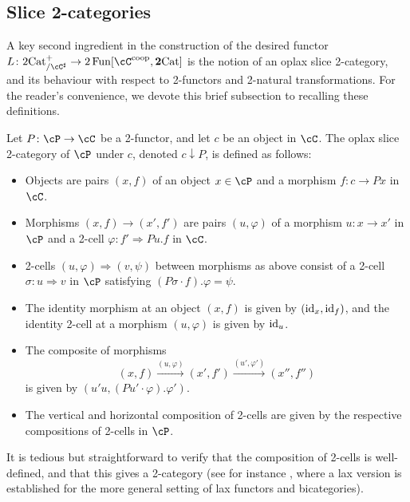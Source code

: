 \documentclass[11pt, dvipsnames]{amsart}
\begin{document}
\subsection{Slice 2-categories}

A key second ingredient in the construction of the desired functor $L\colon\mslicetwocat\to 2\Fun[\cC^\coop,\ttwocat]$ is the notion of an oplax slice 2-category, and its behaviour with respect to 2-functors and 2-natural transformations. For the reader's convenience, we devote this brief subsection to recalling these definitions.

\begin{defn}\label{defn:marked-slices}
    Let $P\colon\cP\to\cC$ be a 2-functor, and let $c$ be an object in $\cC$. The oplax slice 2-category of $\cP$ under $c$, denoted $c\downarrow P$, is defined as follows:
    \begin{itemize}[leftmargin=*]
        \item \label{defn:marked-slices.1} Objects are pairs $(x,f)$ of an object $x\in\cP$ and a morphism $f\colon c\to Px$ in $\cC$.
        
        
        \item \label{defn:marked-slices.2} Morphisms $(x,f)\to(x',f')$ are pairs $(u,\varphi)$ of a morphism $u\colon x\to x'$ in $\cP$ and a 2-cell $\varphi\colon f'\Rightarrow Pu.f$ in $\cC$. 
        
        \item \label{defn:marked-slices.3} 2-cells $(u,\varphi)\Rightarrow(v,\psi)$ between morphisms as above consist of a 2-cell $\sigma\colon u\Rightarrow v$ in $\cP$ satisfying $(P\sigma \cdot f).\varphi=\psi$.

        \item \label{defn:marked-slices.5} The identity morphism at an object $(x,f)$ is given by $(\mathrm{id}_x,\mathrm{id}_f)$, and the identity 2-cell at a morphism $(u,\varphi)$ is given by $\mathrm{id}_u$.
        
        \item \label{defn:marked-slices.4} The composite of morphisms \[(x,f)\xrightarrow{(u,\varphi)}(x',f')\xrightarrow{(u',\varphi')}(x'',f'')\] is given by $(u'u,(Pu'\cdot \varphi).\varphi')$.
        
        
        \item \label{defn:marked-slices.6} The vertical and horizontal composition of 2-cells are given by the respective compositions of 2-cells in $\cP$. 
    \end{itemize}
    It is tedious but straightforward to verify that the composition of 2-cells is well-defined, and that this gives a 2-category (see for instance \cite[Proposition 7.1.2]{Niles2021}, where a lax version is established for the more general setting of lax functors and bicategories).
    \end{defn}
\end{document}
